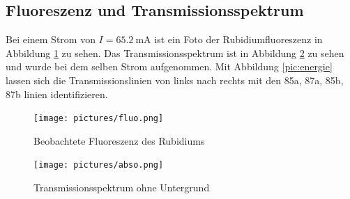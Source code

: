 \subsection{Fluoreszenz und Transmissionsspektrum}
Bei einem Strom von $I = \SI{65.2}{\milli\ampere}$ ist ein Foto der Rubidiumfluoreszenz in Abbildung \ref{pic:flu} zu sehen.
Das Transmissionsspektrum ist in Abbildung \ref{pic:ab} zu sehen und wurde bei dem selben Strom aufgenommen.
Mit Abbildung \ref{pic:energie} lassen sich die Transmissionslinien von links nach
rechts mit den 85a, 87a, 85b, 87b linien identifizieren.
\begin{figure}
    \centering
    \texttt{[image: pictures/fluo.png]}
    \caption{Beobachtete Fluoreszenz des Rubidiums}
    \label{pic:flu}
\end{figure}
\begin{figure}
    \centering
    \texttt{[image: pictures/abso.png]}
    \caption{Transmissionsspektrum ohne Untergrund}
    \label{pic:ab}
\end{figure}